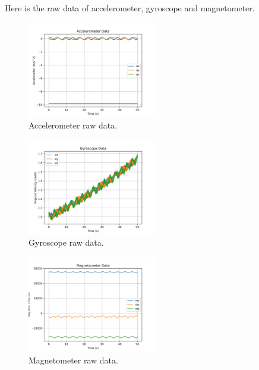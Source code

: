 \documentclass[conference]{IEEEtran}
\begin{document}
    Here is the raw data of accelerometer, gyroscope and magnetometer.
    \begin{figure}[H]
        \centerline{\includegraphics[width=0.5\textwidth]{../Figures/accel.png}}
        \caption{Accelerometer raw data.}
    \end{figure}

    \begin{figure}[H]
        \centerline{\includegraphics[width=0.5\textwidth]{../Figures/gyro.png}}
        \caption{Gyroscope raw data.}
    \end{figure}
    \begin{figure}[H]
        \centerline{\includegraphics[width=0.5\textwidth]{../Figures/mag.png}}
        \caption{Magnetometer raw data.}
    \end{figure}
    
    
\end{document}
